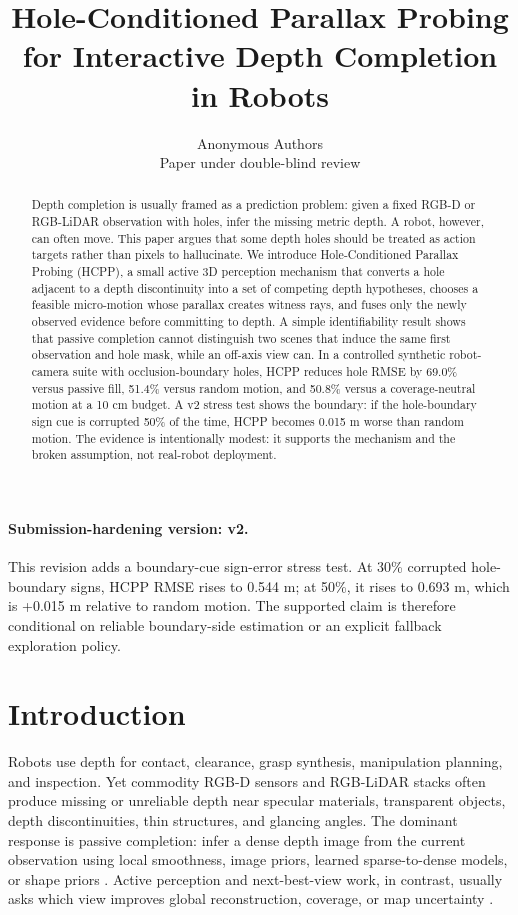 \documentclass{article}
\title{Hole-Conditioned Parallax Probing for Interactive Depth Completion in Robots}
\author{Anonymous Authors\\
Paper under double-blind review}
\begin{document}
\maketitle

\paragraph{Submission-hardening version: v2.}
This revision adds a boundary-cue sign-error stress test. At 30\% corrupted hole-boundary signs, HCPP RMSE rises to 0.544 m; at 50\%, it rises to 0.693 m, which is +0.015 m relative to random motion. The supported claim is therefore conditional on reliable boundary-side estimation or an explicit fallback exploration policy.

\begin{abstract}
Depth completion is usually framed as a prediction problem: given a fixed RGB-D or RGB-LiDAR observation with holes, infer the missing metric depth. A robot, however, can often move. This paper argues that some depth holes should be treated as action targets rather than pixels to hallucinate. We introduce Hole-Conditioned Parallax Probing (HCPP), a small active 3D perception mechanism that converts a hole adjacent to a depth discontinuity into a set of competing depth hypotheses, chooses a feasible micro-motion whose parallax creates witness rays, and fuses only the newly observed evidence before committing to depth. A simple identifiability result shows that passive completion cannot distinguish two scenes that induce the same first observation and hole mask, while an off-axis view can. In a controlled synthetic robot-camera suite with occlusion-boundary holes, HCPP reduces hole RMSE by 69.0\% versus passive fill, 51.4\% versus random motion, and 50.8\% versus a coverage-neutral motion at a 10 cm budget. A v2 stress test shows the boundary: if the hole-boundary sign cue is corrupted 50\% of the time, HCPP becomes 0.015 m worse than random motion. The evidence is intentionally modest: it supports the mechanism and the broken assumption, not real-robot deployment.
\end{abstract}

\section{Introduction}
Robots use depth for contact, clearance, grasp synthesis, manipulation planning, and inspection. Yet commodity RGB-D sensors and RGB-LiDAR stacks often produce missing or unreliable depth near specular materials, transparent objects, depth discontinuities, thin structures, and glancing angles. The dominant response is passive completion: infer a dense depth image from the current observation using local smoothness, image priors, learned sparse-to-dense models, or shape priors \citep{ma2018sparse,song2017sscnet,sajjan2019cleargrasp}. Active perception and next-best-view work, in contrast, usually asks which view improves global reconstruction, coverage, or map uncertainty \citep{bajcsy1988active,curless1996volumetric,newcombe2011kinectfusion}.
\end{document}
